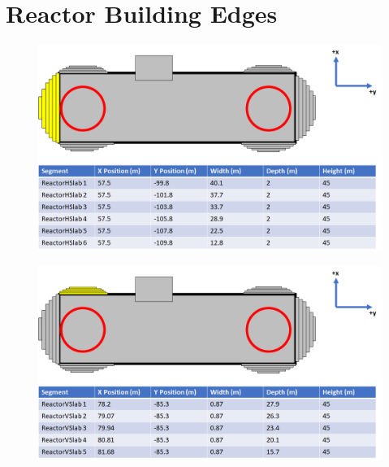 
\chapter{Reactor Building Edges} \label{appenC:ReactorBuildingEdges}

\begin{figure}[htbp]
 \centering
 \includegraphics[width=\linewidth]{Chapter5/Figs/wylfaRasterNew/Slabs1.png}
 \label{fig:slabs1}
\end{figure}

\begin{figure}[htbp]
 \centering
 \includegraphics[width=\linewidth]{Chapter5/Figs/wylfaRasterNew/Slabs3.png}
 \label{fig:slabs3}
\end{figure}

